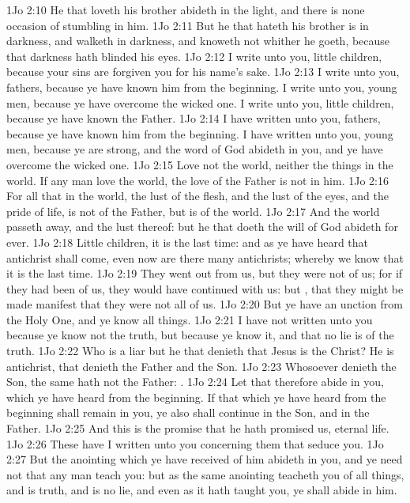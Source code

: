 \vs 1Jo 2:10 He that loveth his brother abideth in the light, and there is none occasion of stumbling in him.
\vs 1Jo 2:11 But he that hateth his brother is in darkness, and walketh in darkness, and knoweth not whither he goeth, because that darkness hath blinded his eyes.
\vs 1Jo 2:12 I write unto you, little children, because your sins are forgiven you for his name's sake.
\vs 1Jo 2:13 I write unto you, fathers, because ye have known him  from the beginning. I write unto you, young men, because ye have overcome the wicked one. I write unto you, little children, because ye have known the Father.
\vs 1Jo 2:14 I have written unto you, fathers, because ye have known him  from the beginning. I have written unto you, young men, because ye are strong, and the word of God abideth in you, and ye have overcome the wicked one.
\vs 1Jo 2:15 Love not the world, neither the things  in the world. If any man love the world, the love of the Father is not in him.
\vs 1Jo 2:16 For all that  in the world, the lust of the flesh, and the lust of the eyes, and the pride of life, is not of the Father, but is of the world.
\vs 1Jo 2:17 And the world passeth away, and the lust thereof: but he that doeth the will of God abideth for ever.
\vs 1Jo 2:18 Little children, it is the last time: and as ye have heard that antichrist shall come, even now are there many antichrists; whereby we know that it is the last time.
\vs 1Jo 2:19 They went out from us, but they were not of us; for if they had been of us, they would  have continued with us: but , that they might be made manifest that they were not all of us.
\vs 1Jo 2:20 But ye have an unction from the Holy One, and ye know all things.
\vs 1Jo 2:21 I have not written unto you because ye know not the truth, but because ye know it, and that no lie is of the truth.
\vs 1Jo 2:22 Who is a liar but he that denieth that Jesus is the Christ? He is antichrist, that denieth the Father and the Son.
\vs 1Jo 2:23 Whosoever denieth the Son, the same hath not the Father: .
\vs 1Jo 2:24 Let that therefore abide in you, which ye have heard from the beginning. If that which ye have heard from the beginning shall remain in you, ye also shall continue in the Son, and in the Father.
\vs 1Jo 2:25 And this is the promise that he hath promised us,  eternal life.
\vs 1Jo 2:26 These  have I written unto you concerning them that seduce you.
\vs 1Jo 2:27 But the anointing which ye have received of him abideth in you, and ye need not that any man teach you: but as the same anointing teacheth you of all things, and is truth, and is no lie, and even as it hath taught you, ye shall abide in him.
